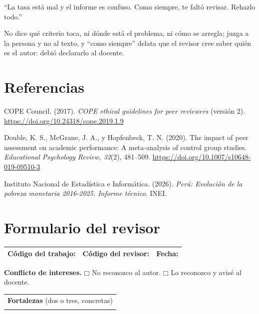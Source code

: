 \documentclass{academic-report}
\begin{document}
\begin{importante}
“La tasa está mal y el informe es confuso. Como siempre, te faltó revisar. Rehazlo todo.”

No dice qué criterio toca, ni dónde está el problema, ni cómo se arregla; juzga a la persona y
no al texto, y “como siempre” delata que el revisor cree saber quién es el autor: debió
declararlo al docente.
\end{importante}


\section*{Referencias}
{\setlength{\parindent}{0pt}
\hangindent=1.27cm
COPE Council. (2017). \textit{COPE ethical guidelines for peer reviewers} (versión 2).
\url{https://doi.org/10.24318/cope.2019.1.9}\par
\hangindent=1.27cm
Double, K. S., McGrane, J. A., y Hopfenbeck, T. N. (2020). The impact of peer assessment on
academic performance: A meta-analysis of control group studies. \textit{Educational Psychology
Review, 32}(2), 481–509. \url{https://doi.org/10.1007/s10648-019-09510-3}\par
\hangindent=1.27cm
Instituto Nacional de Estadística e Informática. (2026). \textit{Perú: Evolución de la pobreza
monetaria 2016-2025. Informe técnico}. INEI.\par}


\newpage
\section*{Formulario del revisor}
\noindent
\begin{tabularx}{\linewidth}{|X|X|X|}
\hline
\textbf{Código del trabajo:} & \textbf{Código del revisor:} & \textbf{Fecha:} \\[0.5em]
\hline
\end{tabularx}

\vspace{0.5em}\noindent
\textbf{Conflicto de intereses.}\quad
$\mdlgwhtsquare$ No reconozco al autor.\quad
$\mdlgwhtsquare$ Lo reconozco y avisé al docente.

\vspace{0.5em}\noindent
\begin{tabularx}{\linewidth}{|X|}
\hline
\textbf{Fortalezas} (dos o tres, concretas) \\
\rule[-1.8cm]{0pt}{1.8cm} \\
\hline
\end{tabularx}
\end{document}
